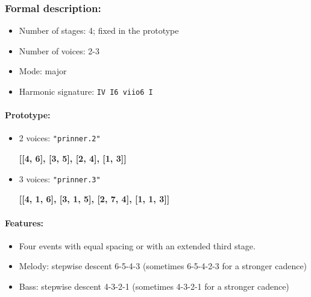 ﻿\documentclass[11pt, openany]{article}
\begin{document}
\begin{itemize}
\subsubsection{Formal description:}
\begin{itemize}
\item Number of stages: 4; fixed in the prototype
\item Number of voices: 2-3
\item Mode: major
\item Harmonic signature: \texttt{IV I6 viio6 I}
\end{itemize}

\paragraph{Prototype:}
\begin{itemize}
\item 2 voices: \texttt{"prinner.2"}
	\begin{center}
	\textbf{[[4, 6], [3, 5], [2, 4], [1, 3]]}
	\end{center}
\item 3 voices: \texttt{"prinner.3"}
	\begin{center}
	\textbf{[[4, 1,  6], [3, 1, 5], [2, 7, 4], [1, 1, 3]]}
	\end{center}
\end{itemize}

\paragraph{Features:}
\begin{itemize}
\item Four events with equal spacing or with an extended third stage.
\item Melody: stepwise descent 6-5-4-3 (sometimes 6-5-4-2-3 for a stronger cadence)
\item Bass: stepwise descent 4-3-2-1 (sometimes 4-3-2-1 for a stronger cadence)
\end{itemize}


\end{itemize}
\end{document}
